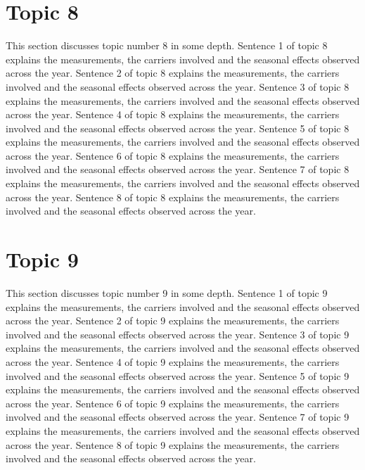 \documentclass[twocolumn,10pt]{article}
\begin{document}
\section{Topic 8}
This section discusses topic number 8 in some depth. Sentence 1 of topic 8 explains the measurements, the carriers involved and the seasonal effects observed across the year. Sentence 2 of topic 8 explains the measurements, the carriers involved and the seasonal effects observed across the year. Sentence 3 of topic 8 explains the measurements, the carriers involved and the seasonal effects observed across the year. Sentence 4 of topic 8 explains the measurements, the carriers involved and the seasonal effects observed across the year. Sentence 5 of topic 8 explains the measurements, the carriers involved and the seasonal effects observed across the year. Sentence 6 of topic 8 explains the measurements, the carriers involved and the seasonal effects observed across the year. Sentence 7 of topic 8 explains the measurements, the carriers involved and the seasonal effects observed across the year. Sentence 8 of topic 8 explains the measurements, the carriers involved and the seasonal effects observed across the year.
\section{Topic 9}
This section discusses topic number 9 in some depth. Sentence 1 of topic 9 explains the measurements, the carriers involved and the seasonal effects observed across the year. Sentence 2 of topic 9 explains the measurements, the carriers involved and the seasonal effects observed across the year. Sentence 3 of topic 9 explains the measurements, the carriers involved and the seasonal effects observed across the year. Sentence 4 of topic 9 explains the measurements, the carriers involved and the seasonal effects observed across the year. Sentence 5 of topic 9 explains the measurements, the carriers involved and the seasonal effects observed across the year. Sentence 6 of topic 9 explains the measurements, the carriers involved and the seasonal effects observed across the year. Sentence 7 of topic 9 explains the measurements, the carriers involved and the seasonal effects observed across the year. Sentence 8 of topic 9 explains the measurements, the carriers involved and the seasonal effects observed across the year.
\end{document}
